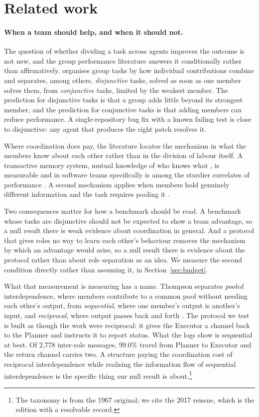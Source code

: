 \documentclass[11pt]{article}
\begin{document}
\section{Related work}
\label{sec:related}

\paragraph{When a team should help, and when it should not.} The question of
whether dividing a task across agents improves the outcome is not new, and the
group performance literature answers it conditionally rather than affirmatively.
\citet{steiner1972group} organises group tasks by how individual contributions
combine and separates, among others, \emph{disjunctive} tasks, solved as soon as
one member solves them, from \emph{conjunctive} tasks, limited by the weakest
member. The prediction for disjunctive tasks is that a group adds little beyond
its strongest member, and the prediction for conjunctive tasks is that adding
members can reduce performance. A single-repository bug fix with a known failing
test is close to disjunctive: any agent that produces the right patch resolves
it.

Where coordination does pay, the literature locates the mechanism in what the
members know about each other rather than in the division of labour itself. A
transactive memory system, mutual knowledge of who knows what
\citep{wegner1987transactive}, is measurable
\citep{lewis2003measuring} and in software teams specifically is among the
sturdier correlates of performance \citep{faraj2000coordinating}. A second
mechanism applies when members hold genuinely different information and the
task requires pooling it \citep{stasser1985pooling}.

Two consequences matter for how a benchmark should be read. A benchmark whose
tasks are disjunctive should not be expected to show a team advantage, so a null
result there is weak evidence about coordination in general. And a protocol that
gives roles no way to learn each other's behaviour removes the mechanism by
which an advantage would arise, so a null result there is evidence about the
protocol rather than about role separation as an idea. We measure the second
condition directly rather than assuming it, in Section~\ref{sec:budget}.

What that measurement is measuring has a name.
Thompson separates \emph{pooled} interdependence,
where members contribute to a common pool without needing each other's output,
from \emph{sequential}, where one member's output is another's input, and
\emph{reciprocal}, where output passes back and forth \citep{thompson2017organizations}. The
protocol we test is
built as though the work were reciprocal: it gives the Executor a channel back
to the Planner and instructs it to report status. What the logs show is
sequential at best. Of 2{,}778 inter-role messages, 99.0\% travel from Planner
to Executor and the return channel carries two. A structure paying the
coordination cost of reciprocal interdependence while realising the information
flow of sequential interdependence is the specific thing our null result is
about.\footnote{The taxonomy is from the 1967 original; we cite the 2017
reissue, which is the edition with a resolvable record.}
\end{document}
